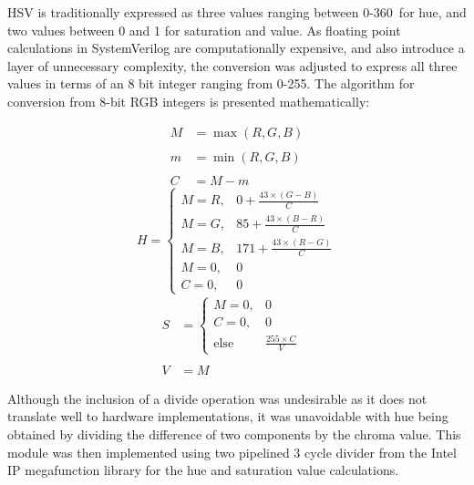 \documentclass[a4paper]{article}
\begin{document}
HSV is traditionally expressed as three values ranging between 0-360\degree\  
for hue, and two values between 0 and 1 for saturation and value.\cite{10.1145/965139.807361}
As floating point calculations in SystemVerilog are computationally expensive, 
and also introduce a layer of unnecessary complexity, the conversion was adjusted
to express all three values in terms of an 8 bit integer ranging from 0-255. The
algorithm for conversion from 8-bit RGB integers is presented mathematically:

\begin{multicols}{3}
    \noindent
    \begin{align*}
        M &= \max(R, G, B) \\ \\
        m &= \min(R, G, B) \\ \\
        C &= M-m 
    \end{align*}
    \begin{equation*}
        H = \begin{cases}
            M = R, & 0 + \frac{43 \times (G-B)}{C} \\
            M = G, & 85 + \frac{43 \times (B-R)}{C} \\
            M = B, & 171 + \frac{43 \times (R-G)}{C} \\
            M = 0, & 0 \\
            C = 0, & 0
        \end{cases} 
    \end{equation*}
    \begin{align*}
        S &= \begin{cases}
            M = 0, & 0 \\ C = 0, & 0 \\ \text{else} & \frac{255\times C}{V}
        \end{cases} & \\ \\
         V &= M  
    \end{align*}
\end{multicols}



Although the inclusion of a divide operation was undesirable as it does not 
translate well to hardware implementations, it was unavoidable with hue being 
obtained by dividing the difference of two components by the chroma value. This 
module was then implemented using two pipelined 3 cycle divider from the Intel IP
megafunction library for the hue and saturation value calculations.  
\end{document}
